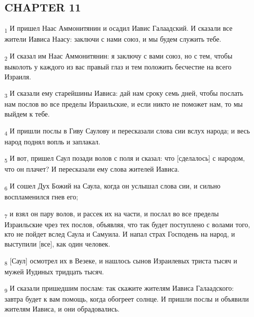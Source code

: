 \subsection{CHAPTER 11}
\begin{tcolorbox}
\textsubscript{1} И пришел Наас Аммонитянин и осадил Иавис Галаадский. И сказали все жители Иависа Наасу: заключи с нами союз, и мы будем служить тебе.
\end{tcolorbox}
\begin{tcolorbox}
\textsubscript{2} И сказал им Наас Аммонитянин: я заключу с вами союз, но с тем, чтобы выколоть у каждого из вас правый глаз и тем положить бесчестие на всего Израиля.
\end{tcolorbox}
\begin{tcolorbox}
\textsubscript{3} И сказали ему старейшины Иависа: дай нам сроку семь дней, чтобы послать нам послов во все пределы Израильские, и если никто не поможет нам, то мы выйдем к тебе.
\end{tcolorbox}
\begin{tcolorbox}
\textsubscript{4} И пришли послы в Гиву Саулову и пересказали слова сии вслух народа; и весь народ поднял вопль и заплакал.
\end{tcolorbox}
\begin{tcolorbox}
\textsubscript{5} И вот, пришел Саул позади волов с поля и сказал: что [сделалось] с народом, что он плачет? И пересказали ему слова жителей Иависа.
\end{tcolorbox}
\begin{tcolorbox}
\textsubscript{6} И сошел Дух Божий на Саула, когда он услышал слова сии, и сильно воспламенился гнев его;
\end{tcolorbox}
\begin{tcolorbox}
\textsubscript{7} и взял он пару волов, и рассек их на части, и послал во все пределы Израильские чрез тех послов, объявляя, что так будет поступлено с волами того, кто не пойдет вслед Саула и Самуила. И напал страх Господень на народ, и выступили [все], как один человек.
\end{tcolorbox}
\begin{tcolorbox}
\textsubscript{8} [Саул] осмотрел их в Везеке, и нашлось сынов Израилевых триста тысяч и мужей Иудиных тридцать тысяч.
\end{tcolorbox}
\begin{tcolorbox}
\textsubscript{9} И сказали пришедшим послам: так скажите жителям Иависа Галаадского: завтра будет к вам помощь, когда обогреет солнце. И пришли послы и объявили жителям Иависа, и они обрадовались.
\end{tcolorbox}
